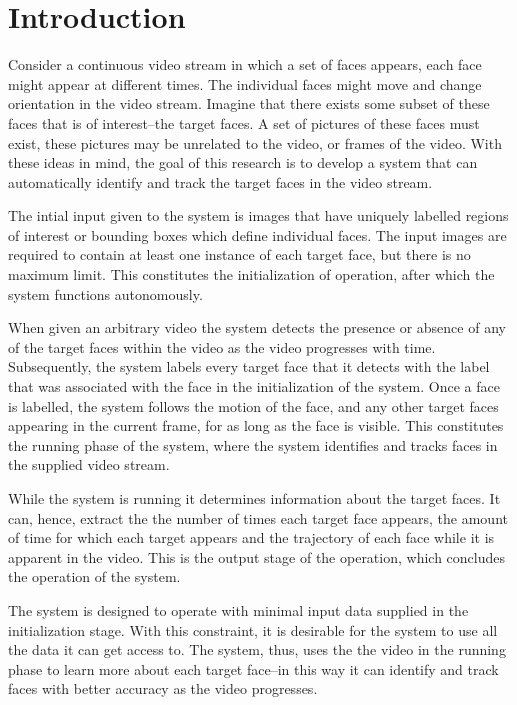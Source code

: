\section{Introduction}
  Consider a continuous video stream in which a set of faces appears, each face might appear at different times.
  The individual faces might move and change orientation in the video stream.
  Imagine that there exists some subset of these faces that is of interest--the target faces.
  A set of pictures of these faces must exist, these pictures may be unrelated to the video, or frames of the video.
  With these ideas in mind, the goal of this research is to develop a system that can automatically identify and track the target faces in the video stream.

  The intial input given to the system is images that have uniquely labelled regions of interest or bounding boxes which define individual faces.
  The input images are required to contain at least one instance of each target face, but there is no maximum limit.
  This constitutes the initialization of operation, after which the system functions autonomously.

  When given an arbitrary video the system detects the presence or absence of any of the target faces within the video as the video progresses with time.
  Subsequently, the system labels every target face that it detects with the label that was associated with the face in the initialization of the system.
  Once a face is labelled, the system follows the motion of the face, and any other target faces appearing in the current frame, for as long as the face is visible.
  This constitutes the running phase of the system, where the system identifies and tracks faces in the supplied video stream.

  While the system is running it determines information about the target faces.
  It can, hence, extract the the number of times each target face appears, the amount of time for which each target appears and the trajectory of each face while it is apparent in the video.
  This is the output stage of the operation, which concludes the operation of the system.

  The system is designed to operate with minimal input data supplied in the initialization stage.
  With this constraint, it is desirable for the system to use all the data it can get access to. 
  The system, thus, uses the the video in the running phase to learn more about each target face--in this way it can identify and track faces with better accuracy as the video progresses.

